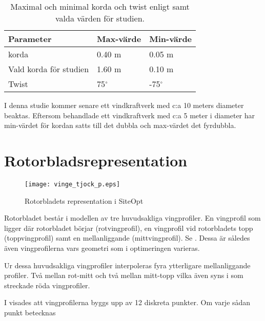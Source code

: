 \bigskip
\begin{table}[!htb]

\small
  \centering
  
    \begin{tabular}{lll}
    
    \toprule
    Parameter & Max-värde & Min-värde \\
    \midrule
    \citet{Victoria} korda & 0.40 m & 0.05 m \\
    Vald korda för studien & 1.60 m & 0.10 m \\
    
    Twist & 75$^{\circ}$ & -75$^{\circ}$ \\
    \bottomrule
    \end{tabular}
  \caption{Maximal och minimal korda och twist enligt  \citet{Victoria} samt valda värden för studien.}
  \label{kordatwistvictoria}
\end{table}

I denna studie kommer senare ett vindkraftverk med c:a 10 meters diameter beaktas. Eftersom \citet{Victoria} behandlade ett vindkraftverk med c:a 5 meter i diameter har min-värdet för kordan satts till det dubbla och max-värdet det fyrdubbla.


\section{Rotorbladsrepresentation}

\begin{figure}[!htb]
  \centering
  \texttt{[image: vinge\_tjock\_p.eps]}
  
  \caption{Rotorbladets representation i SiteOpt}
  \label{rotmellantopp}
\end{figure}

Rotorbladet består i modellen av tre huvudsakliga vingprofiler. En vingprofil som ligger där rotorbladet börjar (rotvingprofil), en vingprofil vid rotorbladets topp (toppvingprofil) samt en mellanliggande (mittvingprofil). Se . Dessa är således även vingprofilerna vars geometri som i optimeringen varieras.

Ur dessa huvudsakliga vingprofiler interpoleras fyra ytterligare mellanliggande profiler. Två mellan rot-mitt och två mellan mitt-topp vilka även syns i  som streckade röda vingprofiler. 

I  visades att vingprofilerna byggs upp av 12 diskreta punkter. Om varje sådan punkt betecknas

